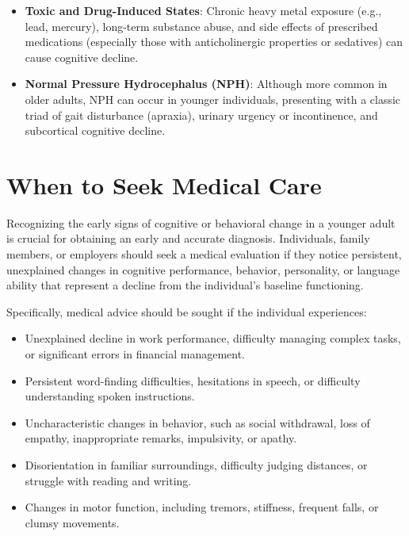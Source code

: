 \begin{itemize}
    \item \textbf{Toxic and Drug-Induced States}: Chronic heavy metal exposure (e.g., lead, mercury), long-term substance abuse, and side effects of prescribed medications (especially those with anticholinergic properties or sedatives) can cause cognitive decline.
    \item \textbf{Normal Pressure Hydrocephalus (NPH)}: Although more common in older adults, NPH can occur in younger individuals, presenting with a classic triad of gait disturbance (apraxia), urinary urgency or incontinence, and subcortical cognitive decline.
\end{itemize}

\section*{When to Seek Medical Care}
Recognizing the early signs of cognitive or behavioral change in a younger adult is crucial for obtaining an early and accurate diagnosis. Individuals, family members, or employers should seek a medical evaluation if they notice persistent, unexplained changes in cognitive performance, behavior, personality, or language ability that represent a decline from the individual's baseline functioning.

Specifically, medical advice should be sought if the individual experiences:
\begin{itemize}
    \item Unexplained decline in work performance, difficulty managing complex tasks, or significant errors in financial management.
    \item Persistent word-finding difficulties, hesitations in speech, or difficulty understanding spoken instructions.
    \item Uncharacteristic changes in behavior, such as social withdrawal, loss of empathy, inappropriate remarks, impulsivity, or apathy.
    \item Disorientation in familiar surroundings, difficulty judging distances, or struggle with reading and writing.
    \item Changes in motor function, including tremors, stiffness, frequent falls, or clumsy movements.
\end{itemize}

